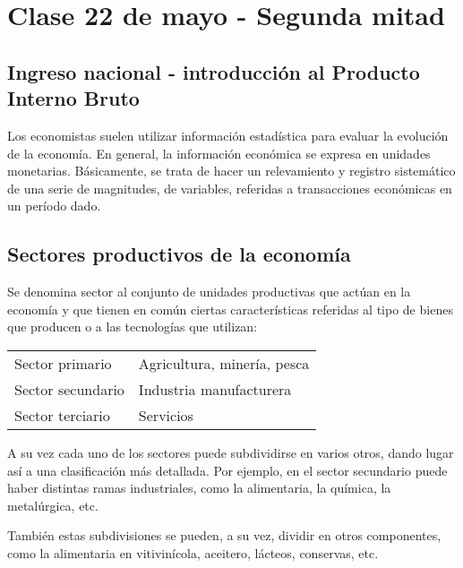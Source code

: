 \section{Clase 22 de mayo - Segunda mitad}

\subsection{Ingreso nacional - introducción al Producto Interno Bruto}

Los economistas suelen utilizar información estadística
para evaluar la evolución de la economía.
En general, 
la información económica se expresa en unidades monetarias.
Básicamente,
se trata de hacer un relevamiento y registro sistemático 
de una serie de magnitudes, de variables,
referidas a transacciones económicas en un período dado.

\subsection{Sectores productivos de la economía}

Se denomina sector al conjunto de unidades productivas 
que actúan en la economía
y que tienen en común ciertas características referidas al tipo de bienes 
que producen o a las tecnologías que utilizan:

\vspace{.5cm}
\begin{table}[H]
    \centering
    \begin{tabular}{ll}
        \hline
        Sector primario   & Agricultura, minería, pesca \\
        Sector secundario & Industria manufacturera    \\
        Sector terciario  & Servicios                  \\
        \hline
    \end{tabular}
\end{table}
\vspace{.5cm}

A su vez cada uno de los sectores puede subdividirse en varios otros,
dando lugar así a una clasificación más detallada.
Por ejemplo,
en el sector secundario puede haber distintas ramas industriales,
como la alimentaria, la química,
la metalúrgica,
etc.

También estas subdivisiones se pueden,
a su vez,
dividir en otros componentes,
como la alimentaria en vitivinícola,
aceitero,
lácteos,
conservas,
etc.

